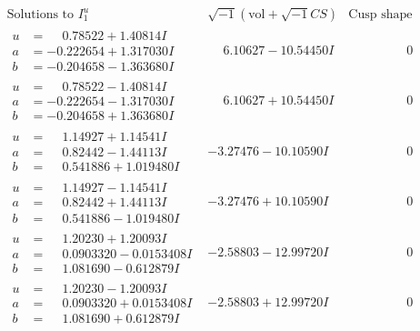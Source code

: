 \documentclass[1p]{elsarticle_modified}
\theoremstyle{definition}
\newcommand{\I}{\sqrt{-1}}
\begin{document}
$$\begin{array}{c|c|c}
\text{Solutions to }I^u_{1}& \I (\text{vol} + \sqrt{-1}CS) & \text{Cusp shape}\\
 \hline 
\begin{aligned}
u &= \phantom{-}0.78522 + 1.40814 I \\
a &= -0.222654 + 1.317030 I \\
b &= -0.204658 - 1.363680 I\end{aligned}
 & \phantom{-}6.10627 - 10.54450 I & \phantom{-0.000000 } 0 \\ \hline\begin{aligned}
u &= \phantom{-}0.78522 - 1.40814 I \\
a &= -0.222654 - 1.317030 I \\
b &= -0.204658 + 1.363680 I\end{aligned}
 & \phantom{-}6.10627 + 10.54450 I & \phantom{-0.000000 } 0 \\ \hline\begin{aligned}
u &= \phantom{-}1.14927 + 1.14541 I \\
a &= \phantom{-}0.82442 - 1.44113 I \\
b &= \phantom{-}0.541886 + 1.019480 I\end{aligned}
 & -3.27476 - 10.10590 I & \phantom{-0.000000 } 0 \\ \hline\begin{aligned}
u &= \phantom{-}1.14927 - 1.14541 I \\
a &= \phantom{-}0.82442 + 1.44113 I \\
b &= \phantom{-}0.541886 - 1.019480 I\end{aligned}
 & -3.27476 + 10.10590 I & \phantom{-0.000000 } 0 \\ \hline\begin{aligned}
u &= \phantom{-}1.20230 + 1.20093 I \\
a &= \phantom{-}0.0903320 - 0.0153408 I \\
b &= \phantom{-}1.081690 - 0.612879 I\end{aligned}
 & -2.58803 - 12.99720 I & \phantom{-0.000000 } 0 \\ \hline\begin{aligned}
u &= \phantom{-}1.20230 - 1.20093 I \\
a &= \phantom{-}0.0903320 + 0.0153408 I \\
b &= \phantom{-}1.081690 + 0.612879 I\end{aligned}
 & -2.58803 + 12.99720 I & \phantom{-0.000000 } 0 \\ \hline\begin{aligned}

\end{aligned}
\end{array}$$
\end{document}
